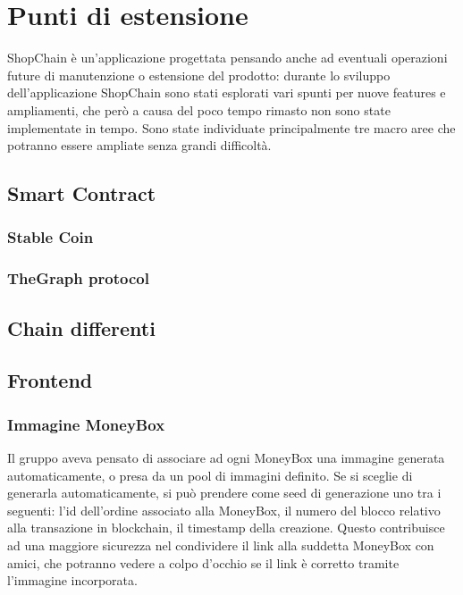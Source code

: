 \section{Punti di estensione} \label{section:punti_estensione}

ShopChain è un'applicazione progettata pensando anche ad eventuali operazioni future di manutenzione o
estensione del prodotto: durante lo sviluppo dell'applicazione ShopChain sono stati esplorati vari spunti per nuove features e ampliamenti, 
che però a causa del poco tempo rimasto non sono state implementate in tempo.
Sono state individuate principalmente tre macro aree che potranno essere ampliate senza grandi difficoltà.

\subsection{Smart Contract}

\subsubsection{Stable Coin}

\subsubsection{TheGraph protocol}

\subsection{Chain differenti}

\subsection{Frontend}

\subsubsection{Immagine MoneyBox}

Il gruppo aveva pensato di associare ad ogni MoneyBox una immagine generata automaticamente, o presa da un pool di immagini definito. Se si sceglie di generarla automaticamente, si può prendere come seed di generazione uno tra i seguenti: l'id dell'ordine associato alla MoneyBox, 
il numero del blocco relativo alla transazione in blockchain, il timestamp della creazione. 
Questo contribuisce ad una maggiore sicurezza nel condividere il link alla suddetta MoneyBox con amici, che potranno vedere a colpo d'occhio se il link è corretto tramite l'immagine incorporata.

